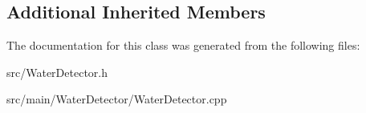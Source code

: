 \subsection*{Additional Inherited Members}


The documentation for this class was generated from the following files\+:\begin{DoxyCompactItemize}
\item 
src/Water\+Detector.\+h\item 
src/main/\+Water\+Detector/Water\+Detector.\+cpp\end{DoxyCompactItemize}
